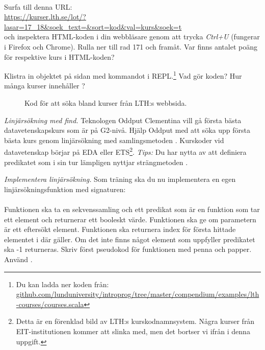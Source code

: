 \QUESTEND





\QUESTBEGIN

\Task \label{task:linsearch-lth} \what~

\Subtask Surfa till denna URL:\\ {\nolinebreak[4]\footnotesize\url{https://kurser.lth.se/lot/?lasar=17_18&soek_text=&sort=kod&val=kurs&soek=t}}
\\
och inspektera HTML-koden i din webbläsare genom att trycka \emph{Ctrl+U} (fungerar i Firefox och Chrome). Rulla ner till rad 171 och framåt. Var finns antalet poäng för respektive kurs i HTML-koden?

\Subtask \label{subtask:download-lthcourses} Klistra in objektet  på sidan \pageref{lth-courses} med kommandot  i REPL.\footnote{Du kan ladda ner koden från: \\ \href{https://raw.githubusercontent.com/lunduniversity/introprog/master/compendium/examples/lth-courses/courses.scala}{github.com/lunduniversity/introprog/tree/master/compendium/examples/lth-courses/courses.scala}} Vad gör koden? Hur många kurser innehåller ?

\begin{figure}
  \caption{Kod för att söka bland kurser från LTH:s webbsida.}
  \label{lth-courses}
\end{figure}


\Subtask \emph{Linjärsökning med find.} Teknologen Oddput Clementina vill gå första bästa datavetenskapskurs som är på G2-nivå. Hjälp Oddput med att söka upp första bästa kurs genom linjärsökning med samlingsmetoden . Kurskoder vid datavetenskap börjar på EDA eller ETS\footnote{Detta är en förenklad bild av LTH:s kurskodnamnsystem. Några kurser från EIT-institutionen  kommer att slinka med, men det bortser vi ifrån i denna uppgift.}. \emph{Tips:} Du har nytta av att definiera predikatet  som i sin tur lämpligen nyttjar strängmetoden .

\Subtask \emph{Implementera linjärsökning.} Som träning ska du nu implementera en egen linjärsökningsfunktion med signaturen: \\ 
\\ Funktionen ska ta en sekvenssamling  och ett predikat  som är en funktion som tar ett element och returnerar ett booleskt värde. Funktionen  ska ge  om parametern är ett eftersökt element. Funktionen  ska returnera index för första hittade elementet i  där  gäller. Om det inte finns något element som uppfyller predikatet ska -1 returneras. Skriv först pseudokod för funktionen med penna och papper. Använd .


